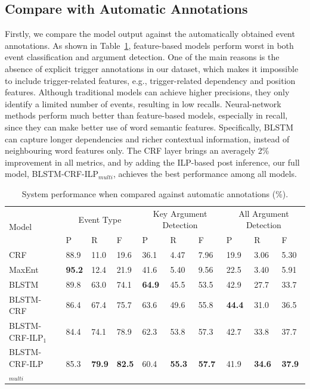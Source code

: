 \subsection{Compare with Automatic Annotations}
Firstly, we compare the model output against the automatically obtained event annotations.
As shown in Table~\ref{tab:1}, feature-based models perform worst in both event classification and argument detection.
One of the main reasons is the absence of explicit trigger annotations in our dataset, which makes it impossible to include trigger-related features, e.g., trigger-related dependency and position features.
Although traditional models can achieve higher precisions, they only identify a limited number of events, resulting in low recalls.
Neural-network methods perform much better than feature-based models, especially in recall, since they can make better use of word semantic features. Specifically, BLSTM can capture longer dependencies and richer contextual information, instead of neighbouring word features only.
The CRF layer brings an averagely 2\% improvement in all metrics, and by adding the ILP-based post inference, our full model, BLSTM-CRF-ILP$_{multi}$, achieves the best performance among all models.

\begin{table}[!t]
\centering
\scriptsize
\begin{tabular}{|l|p{}<{\centering}|p{}<{\centering}|p{}<{\centering}|p{}<{\centering}|p{}<{\centering}|p{}<{\centering}|p{}<{\centering}|p{}<{\centering}|p{}<{\centering}|} \hline
	\multirow{2}{*}{Model} & \multicolumn{3}{c|}{Event Type} & \multicolumn{3}{c|}{Key Argument Detection} &
	\multicolumn{3}{c|}{All Argument Detection} \\ \cline{2-10}
	 & P & R & F & P & R & F & P & R & F \\ \hline
	CRF & 88.9 & 11.0 & 19.6 & 36.1 & 4.47 & 7.96 & 19.9 & 3.06 & 5.30  \\ \hline
	MaxEnt & \textbf{95.2} & 12.4 & 21.9 & 41.6 & 5.40 & 9.56 & 22.5 & 3.40 & 5.91 \\ \hline
	BLSTM & 89.8 & 63.0 & 74.1 & \textbf{64.9} & 45.5 & 53.5 & 42.9 & 27.7 & 33.7  \\ \hline \hline
	BLSTM-CRF & 86.4 & 67.4 & 75.7 & 63.6 & 49.6 & 55.8 & \textbf{44.4} & 31.0 & 36.5  \\ \hline
	BLSTM-CRF-ILP$_{1}$ & 84.4 & 74.1 & 78.9 & 62.3 & 53.8 & 57.3 & 42.7 & 33.8 & 37.7 \\ \hline
	BLSTM-CRF-ILP$_{multi}$ & 85.3 & \textbf{79.9} & \textbf{82.5} & 60.4 & \textbf{55.3} & \textbf{57.7} & 41.9 & \textbf{34.6} & \textbf{37.9} \\ \hline
\end{tabular}
\caption{System performance when compared against automatic annotations (\%).  \label{tab:1}}
\end{table}

